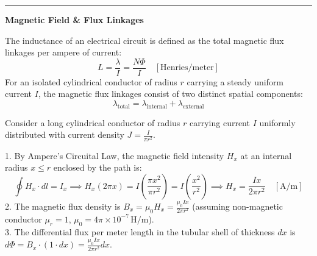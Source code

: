 \documentclass[11pt,a4paper]{article}
\newcommand{\concept}[1]{%
  \vspace{3pt}\noindent\textcolor{AnthGreen}{\rule{3.5pt}{10pt}}\enspace
  \textbf{\sffamily\color{AnthDark}#1}\par\vspace{2pt}%
}
\newenvironment{Deriv}[1][Mathematical Derivation]{\begin{tcolorbox}[derivbox, title=#1]}{\end{tcolorbox}}
\begin{document}
\concept{Magnetic Field \& Flux Linkages}
The inductance of an electrical circuit is defined as the total magnetic flux linkages per ampere of current:
\begin{equation}
  L = \frac{\lambda}{I} = \frac{N \Phi}{I} \quad [\text{Henries/meter}]
\end{equation}
For an isolated cylindrical conductor of radius $r$ carrying a steady uniform current $I$, the magnetic flux linkages consist of two distinct spatial components:
\begin{equation}
  \lambda_{\text{total}} = \lambda_{\text{internal}} + \lambda_{\text{external}}
\end{equation}

\begin{Deriv}[Derivation of Internal Flux Linkage ($\lambda_{\text{int}}$)]
Consider a long cylindrical conductor of radius $r$ carrying current $I$ uniformly distributed with current density $J = \frac{I}{\pi r^2}$.
\begin{center}
\end{center}
1. By Ampere's Circuital Law, the magnetic field intensity $H_x$ at an internal radius $x \le r$ enclosed by the path is:
\begin{equation}
  \oint H_x \cdot dl = I_x \implies H_x (2\pi x) = I \left( \frac{\pi x^2}{\pi r^2} \right) = I \left(\frac{x^2}{r^2}\right) \implies H_x = \frac{I x}{2\pi r^2} \quad [\text{A/m}]
\end{equation}
2. The magnetic flux density is $B_x = \mu_0 H_x = \frac{\mu_0 I x}{2\pi r^2}$ (assuming non-magnetic conductor $\mu_r = 1$, $\mu_0 = 4\pi \times 10^{-7}\,\text{H/m}$).\\
3. The differential flux per meter length in the tubular shell of thickness $dx$ is $d\Phi = B_x \cdot (1 \cdot dx) = \frac{\mu_0 I x}{2\pi r^2} dx$.\\

\end{Deriv}
\end{document}
